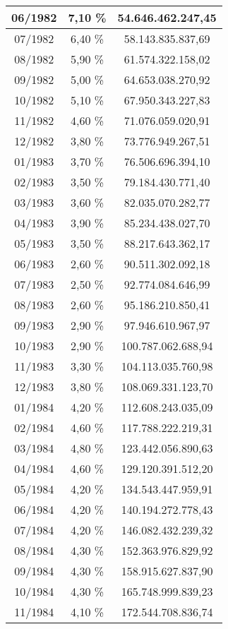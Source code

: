 \begin{center}
\begin{longtable}{|c|c|c|}
06/1982 & 7,10 \% & 54.646.462.247,45 \\ \hline
07/1982 & 6,40 \% & 58.143.835.837,69 \\ \hline
08/1982 & 5,90 \% & 61.574.322.158,02 \\ \hline
09/1982 & 5,00 \% & 64.653.038.270,92 \\ \hline
10/1982 & 5,10 \% & 67.950.343.227,83 \\ \hline
11/1982 & 4,60 \% & 71.076.059.020,91 \\ \hline
12/1982 & 3,80 \% & 73.776.949.267,51 \\ \hline
01/1983 & 3,70 \% & 76.506.696.394,10 \\ \hline
02/1983 & 3,50 \% & 79.184.430.771,40 \\ \hline
03/1983 & 3,60 \% & 82.035.070.282,77 \\ \hline
04/1983 & 3,90 \% & 85.234.438.027,70 \\ \hline
05/1983 & 3,50 \% & 88.217.643.362,17 \\ \hline
06/1983 & 2,60 \% & 90.511.302.092,18 \\ \hline
07/1983 & 2,50 \% & 92.774.084.646,99 \\ \hline
08/1983 & 2,60 \% & 95.186.210.850,41 \\ \hline
09/1983 & 2,90 \% & 97.946.610.967,97 \\ \hline
10/1983 & 2,90 \% & 100.787.062.688,94 \\ \hline
11/1983 & 3,30 \% & 104.113.035.760,98 \\ \hline
12/1983 & 3,80 \% & 108.069.331.123,70 \\ \hline
01/1984 & 4,20 \% & 112.608.243.035,09 \\ \hline
02/1984 & 4,60 \% & 117.788.222.219,31 \\ \hline
03/1984 & 4,80 \% & 123.442.056.890,63 \\ \hline
04/1984 & 4,60 \% & 129.120.391.512,20 \\ \hline
05/1984 & 4,20 \% & 134.543.447.959,91 \\ \hline
06/1984 & 4,20 \% & 140.194.272.778,43 \\ \hline
07/1984 & 4,20 \% & 146.082.432.239,32 \\ \hline
08/1984 & 4,30 \% & 152.363.976.829,92 \\ \hline
09/1984 & 4,30 \% & 158.915.627.837,90 \\ \hline
10/1984 & 4,30 \% & 165.748.999.839,23 \\ \hline
11/1984 & 4,10 \% & 172.544.708.836,74 \\ \hline

\end{longtable}
\end{center}
